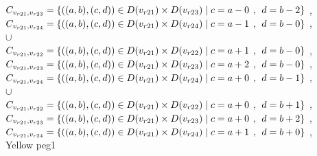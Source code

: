 \\$C_{v_{r21},v_{r23}}=\{((a,b),(c,d))\in D(v_{r21}) \times D(v_{r23})\mid c = a - 0\hspace{1ex} , \hspace{1ex}  d = b - 2 \}$ , 
\\$C_{v_{r21},v_{r24}}=\{((a,b),(c,d))\in D(v_{r21}) \times D(v_{r24})\mid c = a - 1\hspace{1ex} , \hspace{1ex}  d = b - 0 \}$ , 
\\$\cup$
\\$C_{v_{r21},v_{r22}}=\{((a,b),(c,d))\in D(v_{r21}) \times D(v_{r22})\mid c = a + 1\hspace{1ex} , \hspace{1ex}  d = b - 0 \}$ , 
\\$C_{v_{r21},v_{r23}}=\{((a,b),(c,d))\in D(v_{r21}) \times D(v_{r23})\mid c = a + 2\hspace{1ex} , \hspace{1ex}  d = b - 0 \}$ , 
\\$C_{v_{r21},v_{r24}}=\{((a,b),(c,d))\in D(v_{r21}) \times D(v_{r24})\mid c = a + 0\hspace{1ex} , \hspace{1ex}  d = b - 1 \}$ , 
\\$\cup$
\\$C_{v_{r21},v_{r22}}=\{((a,b),(c,d))\in D(v_{r21}) \times D(v_{r22})\mid c = a + 0\hspace{1ex} , \hspace{1ex}  d = b + 1 \}$ , 
\\$C_{v_{r21},v_{r23}}=\{((a,b),(c,d))\in D(v_{r21}) \times D(v_{r23})\mid c = a + 0\hspace{1ex} , \hspace{1ex}  d = b + 2 \}$ , 
\\$C_{v_{r21},v_{r24}}=\{((a,b),(c,d))\in D(v_{r21}) \times D(v_{r24})\mid c = a + 1\hspace{1ex} , \hspace{1ex}  d = b + 0 \}$ , 
\\ Yellow peg1 
